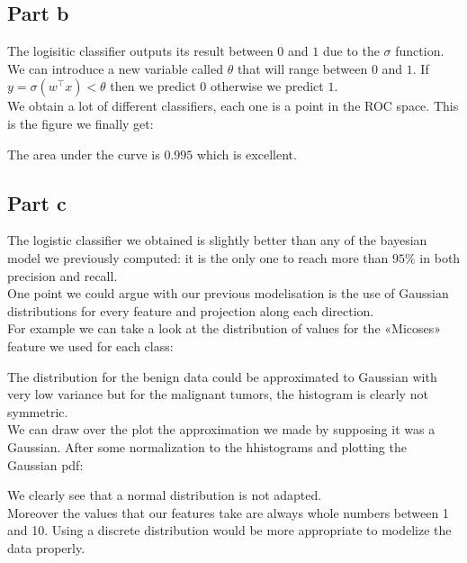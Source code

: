 \documentclass[a4paper, 10pt]{article}
\begin{document}
\subsection{Part b}
The logisitic classifier outputs its result between $0$ and $1$ due to the $\sigma$ function.
We can introduce a new variable called $\theta$ that will range between $0$ and $1$. 
If $y=\sigma(w^\top x) < \theta$ then we predict $0$ otherwise we predict $1$. 
\\
We obtain a lot of different classifiers, each one is a point in the ROC space. This is the figure 
we finally get:
\begin{center}
\end{center}
The area under the curve is $0.995$ which is excellent.

\subsection{Part c}
The logistic classifier we obtained is slightly better than any of the bayesian model we previously computed:
it is the only one to reach more than $95\%$ in both precision and recall.
\\
One point we could argue with our previous modelisation is the use of Gaussian distributions for every feature
and projection along each direction.
\\
For example we can take a look at the distribution of values for the «Micoses» feature we used for each class:
\begin{center}
\end{center}
The distribution for the benign data could be approximated to Gaussian with very low variance but
for the malignant tumors, the histogram is clearly not symmetric.
\\
We can draw over the plot the approximation we made by supposing it was a Gaussian. After some normalization
to the hhistograms and plotting the Gaussian pdf:
\begin{center}
\end{center}
We clearly see that a normal distribution is not adapted.
\\
Moreover the values that our features take are always whole numbers between 1 and 10. Using a discrete
distribution would be more appropriate to modelize the data properly.
\end{document}
